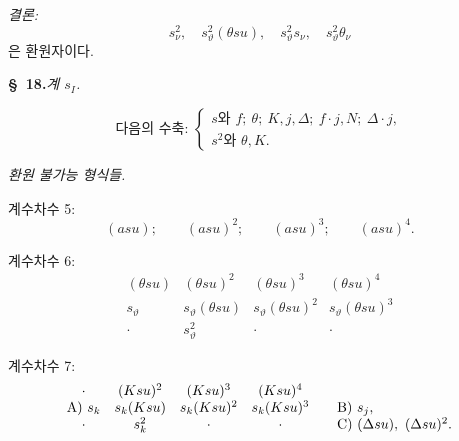 
\noindent\emph{결론:}
\[
 s_\nu^2,\quad s_\vartheta^2(\theta su),\quad s_\vartheta^2s_\nu,\quad s_\vartheta^2\theta_\nu
\]
은 환원자이다.

\begin{center}
\textbf{\S\ 18.}\quad\emph{계 $s_I$.}
\end{center}

\[
\text{다음의 수축: }\left\{\begin{array}{l}
s\text{와 } f;\ \theta;\ K,j,\Delta;\ f\cdot j,N;\ \Delta\cdot j,\\
s^2\text{와 }\theta,K.
\end{array}\right.
\]

\noindent\emph{환원 불가능 형식들.}

\noindent 계수차수 5:
\[
(asu);\qquad (asu)^2;\qquad (asu)^3;\qquad (asu)^4.
\]

\noindent 계수차수 6:
\[
\begin{array}{cccc}
(\theta su)&(\theta su)^2&(\theta su)^3&(\theta su)^4\\
s_\vartheta&s_\vartheta(\theta su)&s_\vartheta(\theta su)^2&s_\vartheta(\theta su)^3\\
\cdot&s_\vartheta^2&\cdot&\cdot
\end{array}
\]

\noindent 계수차수 7:
\[
\begin{array}{c@{\quad}c@{\quad}c@{\quad}c@{\qquad}l}
\cdot&(Ksu)^2&(Ksu)^3&(Ksu)^4&\\
\text{A)}\ s_k&s_k(Ksu)&s_k(Ksu)^2&s_k(Ksu)^3&
\text{B)}\ s_j,\\
\cdot&s_k^2&\cdot&\cdot&
\text{C)}\ (\Delta su),\ (\Delta su)^2.
\end{array}
\]

